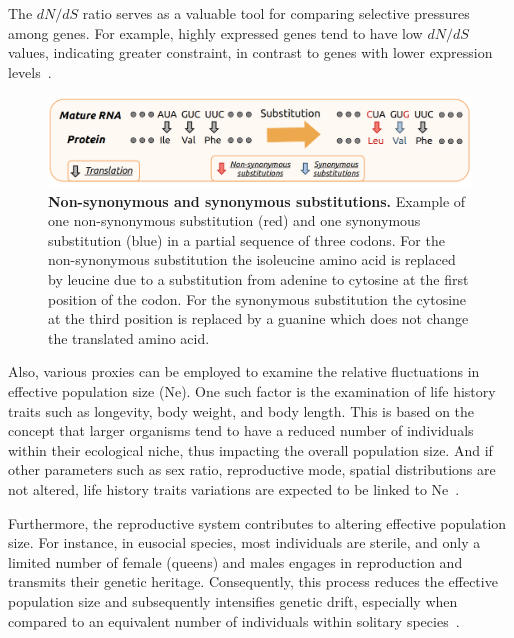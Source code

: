 The ${dN}/{dS}$ ratio serves as a valuable tool for comparing selective pressures among genes. For example, highly expressed genes tend to have low ${dN}/{dS}$ values, indicating greater constraint, in contrast to genes with lower expression levels~\citep{duret_determinants_2000, rocha_analysis_2004, pagan_level_2012, brion_evolution_2015}.

\begin{figure}[H]
    \centering
    \includegraphics[width=\linewidth]{figures/dnds.png}
    \caption[Non-synonymous and synonymous substitutions]{\textbf{Non-synonymous and synonymous substitutions.} Example of one \gls{non-synonymous} substitution (red) and one \gls{synonymous} substitution (blue) in a partial sequence of three \gls{codon}s. For the \gls{non-synonymous} substitution the isoleucine amino acid is replaced by leucine due to a substitution from adenine to cytosine at the first position of the \gls{codon}. For the \gls{synonymous} substitution the cytosine at the third position is replaced by a guanine which does not change the translated amino acid.}
    \label{fig:dnds}
\end{figure}

Also, various proxies can be employed to examine the relative fluctuations in \gls{effective population size} (\acrshort{Ne}). One such factor is the examination of life history traits such as longevity, body weight, and body length. This is based on the concept that larger organisms tend to have a reduced number of individuals within their ecological niche, thus impacting the overall population size. And if other parameters such as sex ratio, reproductive mode, spatial distributions are not altered, life history traits variations are expected to be linked to \acrshort{Ne}~\citep{waples_life-history_2016, figuet_life_2016, galtier_adaptive_2016, weyna_relaxation_2020}.

Furthermore, the reproductive system contributes to altering \gls{effective population size}. For instance, in eusocial species, most individuals are sterile, and only a limited number of female (queens) and males engages in reproduction and transmits their genetic heritage. Consequently, this process reduces the \gls{effective population size} and subsequently intensifies genetic drift, especially when compared to an equivalent number of individuals within solitary species~\citep{romiguier_population_2014}.


